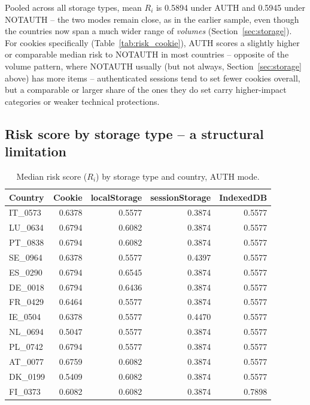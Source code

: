 \documentclass[11pt,a4paper]{article}
\begin{document}
Pooled across all storage types, mean $R_i$ is 0.5894 under AUTH and
0.5945 under NOTAUTH -- the two modes remain close, as in the earlier
sample, even though the countries now span a much wider range of \emph{volumes}
(Section~\ref{sec:storage}). For cookies specifically (Table~\ref{tab:risk_cookie}),
AUTH scores a slightly higher or comparable median risk to NOTAUTH in most
countries -- opposite of the volume pattern, where NOTAUTH usually (but not
always, Section~\ref{sec:storage} above) has more items -- authenticated
sessions tend to set fewer cookies overall, but a comparable or larger share
of the ones they do set carry higher-impact categories or weaker technical
protections.

\subsection{Risk score by storage type -- a structural limitation}

\begin{table}[h]
\centering
\caption{Median risk score ($R_i$) by storage type and country, AUTH mode.}\label{tab:risk_by_storage_auth}
\begin{tabular}{lrrrr}
\toprule
Country & Cookie & localStorage & sessionStorage & IndexedDB \\
\midrule
IT\_0573 & 0.6378 & 0.5577 & 0.3874 & 0.5577 \\
LU\_0634 & 0.6794 & 0.6082 & 0.3874 & 0.5577 \\
PT\_0838 & 0.6794 & 0.6082 & 0.3874 & 0.5577 \\
SE\_0964 & 0.6378 & 0.5577 & 0.4397 & 0.5577 \\
ES\_0290 & 0.6794 & 0.6545 & 0.3874 & 0.5577 \\
DE\_0018 & 0.6794 & 0.6436 & 0.3874 & 0.5577 \\
FR\_0429 & 0.6464 & 0.5577 & 0.3874 & 0.5577 \\
IE\_0504 & 0.6378 & 0.5577 & 0.4470 & 0.5577 \\
NL\_0694 & 0.5047 & 0.5577 & 0.3874 & 0.5577 \\
PL\_0742 & 0.6794 & 0.5577 & 0.3874 & 0.5577 \\
AT\_0077 & 0.6759 & 0.6082 & 0.3874 & 0.5577 \\
DK\_0199 & 0.5409 & 0.6082 & 0.3874 & 0.5577 \\
FI\_0373 & 0.6082 & 0.6082 & 0.3874 & 0.7898 \\
\bottomrule
\end{tabular}
\end{table}
\end{document}
